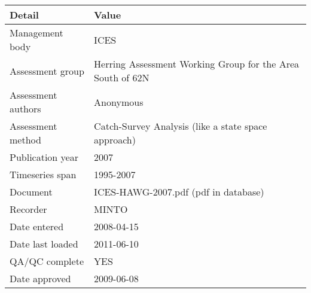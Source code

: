 \begin{table}[htb]
\centering
\begin{tabular}{lp{7cm}}
\toprule
Detail & Value \\
\midrule
Management body    & ICES                                                       \\
Assessment group   & Herring Assessment Working Group for the Area South of 62N \\
Assessment authors & Anonymous                                                  \\
Assessment method  & Catch-Survey Analysis (like a state space approach)        \\
Publication year   & 2007                                                       \\
Timeseries span    & 1995-2007                                                  \\
Document           & ICES-HAWG-2007.pdf (pdf in database)                       \\
Recorder           & MINTO                                                      \\
Date entered       & 2008-04-15                                                 \\
Date last loaded   & 2011-06-10                                                 \\
QA/QC complete     & YES                                                        \\
Date approved      & 2009-06-08                                                 \\
\bottomrule
\end{tabular}
\label{tab:assessdet}
\end{table}
